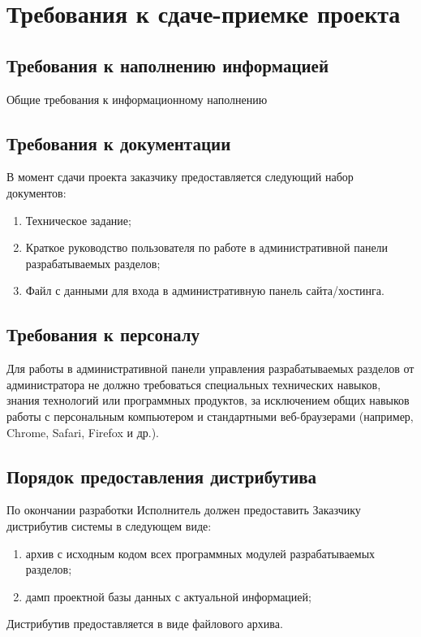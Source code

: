 \section{Требования к сдаче-приемке проекта}
\subsection{Требования к наполнению информацией}
Общие требования к информационному наполнению

\subsection{Требования к документации}
В момент сдачи проекта заказчику предоставляется следующий набор документов:
\begin{enumerate}
  \item Техническое задание;
  \item Краткое руководство пользователя по работе в административной панели разрабатываемых разделов;
  \item Файл с данными для входа в административную панель сайта/хостинга.
\end{enumerate}

\subsection{Требования к персоналу}
Для работы в административной панели управления разрабатываемых разделов от администратора не должно требоваться специальных технических навыков, знания технологий или программных продуктов, за исключением общих навыков работы с персональным компьютером и стандартными веб-браузерами (например, Chrome, Safari, Firefox и др.).

\subsection{Порядок предоставления дистрибутива}
По окончании разработки Исполнитель должен предоставить Заказчику дистрибутив системы в следующем виде:
\begin{enumerate}
  \item архив с исходным кодом всех программных модулей разрабатываемых разделов;
  \item дамп проектной базы данных с актуальной информацией;
\end{enumerate}

Дистрибутив предоставляется в виде файлового архива.

